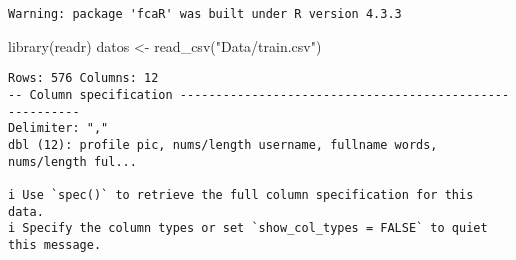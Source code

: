 \documentclass[
  letterpaper,
  DIV=11,
  numbers=noendperiod]{scrreprt}
\newenvironment{Shaded}{\begin{snugshade}}{\end{snugshade}}
\newcommand{\AttributeTok}[1]{\textcolor[rgb]{0.40,0.45,0.13}{#1}}
\newcommand{\ControlFlowTok}[1]{\textcolor[rgb]{0.00,0.23,0.31}{#1}}
\newcommand{\FunctionTok}[1]{\textcolor[rgb]{0.28,0.35,0.67}{#1}}
\newcommand{\NormalTok}[1]{\textcolor[rgb]{0.00,0.23,0.31}{#1}}
\newcommand{\OtherTok}[1]{\textcolor[rgb]{0.00,0.23,0.31}{#1}}
\newcommand{\SpecialCharTok}[1]{\textcolor[rgb]{0.37,0.37,0.37}{#1}}
\newcommand{\StringTok}[1]{\textcolor[rgb]{0.13,0.47,0.30}{#1}}
\begin{document}
\begin{verbatim}
Warning: package 'fcaR' was built under R version 4.3.3
\end{verbatim}

\begin{Shaded}
\begin{Highlighting}[]
\FunctionTok{library}\NormalTok{(readr)}
\NormalTok{datos }\OtherTok{\textless{}{-}} \FunctionTok{read\_csv}\NormalTok{(}\StringTok{"Data/train.csv"}\NormalTok{) }
\end{Highlighting}
\end{Shaded}

\begin{verbatim}
Rows: 576 Columns: 12
-- Column specification --------------------------------------------------------
Delimiter: ","
dbl (12): profile pic, nums/length username, fullname words, nums/length ful...

i Use `spec()` to retrieve the full column specification for this data.
i Specify the column types or set `show_col_types = FALSE` to quiet this message.
\end{verbatim}

\begin{Shaded}
\end{Shaded}
\end{document}
